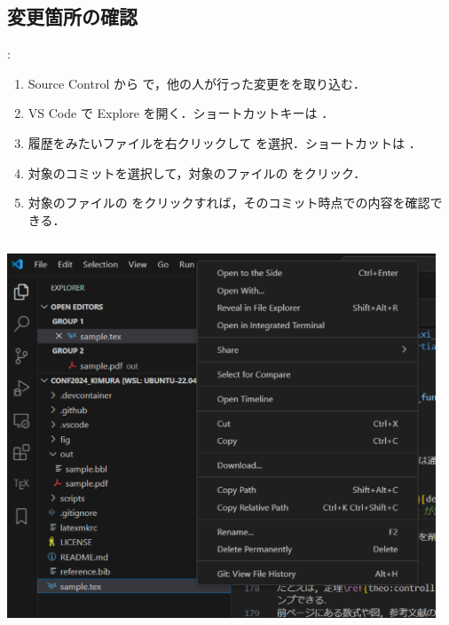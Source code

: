 \documentclass[aspectratio=169,dvipdfmx,cjk]{beamer}
\begin{document}
\subsection{変更箇所の確認}
\begin{frame}{\insertsection \thesubsection: \insertsubsection}
  \begin{enumerate}
    \item Source Control から  で，他の人が行った変更をを取り込む．
    \item VS Code で Explore を開く．ショートカットキーは ．
    \item 履歴をみたいファイルを右クリックして を選択．ショートカットは ．
    \item 対象のコミットを選択して，対象のファイルの  をクリック．
    \item 対象のファイルの  をクリックすれば，そのコミット時点での内容を確認できる．
  \end{enumerate}
  \begin{columns}
    \begin{column}{0.3\textwidth}
        \includegraphics[width=1.0\linewidth]{fig/git-history1.png}
    \end{column}
    \begin{column}{0.3\textwidth}

\end{column}
\end{columns}
\end{frame}
\end{document}
